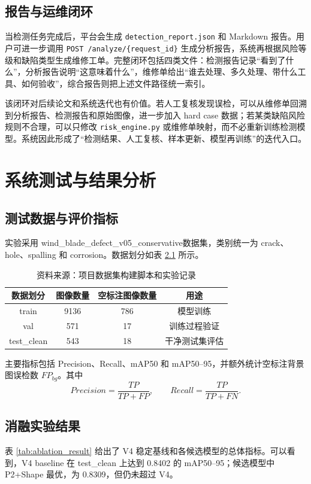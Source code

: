 \documentclass[UTF8,zihao=-4,a4paper]{ctexrep}
\newcommand{\dataset}{wind\_blade\_defect\_v05\_conservative}
\newcommand{\code}[1]{\texttt{#1}}
\newcommand{\tablesource}[1]{\vspace{-0.4em}\caption*{\footnotesize 资料来源：#1}}
\begin{document}
\section{报告与运维闭环}
当检测任务完成后，平台会生成 \code{detection\_report.json} 和 Markdown 报告。用户可进一步调用 \code{POST /analyze/\{request\_id\}} 生成分析报告，系统再根据风险等级和缺陷类型生成维修工单。完整闭环包括四类文件：检测报告记录“看到了什么”，分析报告说明“这意味着什么”，维修单给出“谁去处理、多久处理、带什么工具、如何验收”，综合报告则把上述文件路径统一索引。

该闭环对后续论文和系统迭代也有价值。若人工复核发现误检，可以从维修单回溯到分析报告、检测报告和原始图像，进一步加入 hard case 数据；若某类缺陷风险规则不合理，可以只修改 \code{risk\_engine.py} 或维修单映射，而不必重新训练检测模型。系统因此形成了“检测结果、人工复核、样本更新、模型再训练”的迭代入口。

\chapter{系统测试与结果分析}

\section{测试数据与评价指标}
实验采用 \dataset 数据集，类别统一为 crack、hole、spalling 和 corrosion。数据划分如表 \ref{tab:dataset_split} 所示。

\begin{table}[H]
  \centering
  \caption{数据集划分统计}
  \label{tab:dataset_split}
  \begin{tabular}{cccc}
    \toprule
    数据划分 & 图像数量 & 空标注图像数量 & 用途 \\
    \midrule
    train & 9136 & 786 & 模型训练 \\
    val & 571 & 17 & 训练过程验证 \\
    test\_clean & 543 & 18 & 干净测试集评估 \\
    \bottomrule
  \end{tabular}
  \tablesource{项目数据集构建脚本和实验记录}
\end{table}

主要指标包括 Precision、Recall、mAP50 和 mAP50--95，并额外统计空标注背景图误检数 $FP_{bg}$。其中
\begin{equation}
  Precision=\frac{TP}{TP+FP},\qquad
  Recall=\frac{TP}{TP+FN}.
\end{equation}

\section{消融实验结果}
表 \ref{tab:ablation_result} 给出了 V4 稳定基线和各候选模型的总体指标。可以看到，V4 baseline 在 test\_clean 上达到 0.8402 的 mAP50--95；候选模型中 P2+Shape 最优，为 0.8309，但仍未超过 V4。
\end{document}
